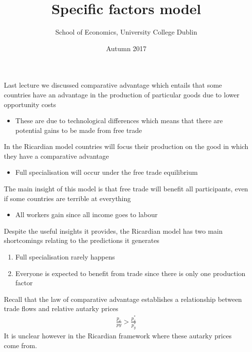 \documentclass{beamer}
\title{Specific factors model}
\author{School of Economics, University College Dublin}
\date{Autumn 2017}
\begin{document}
\begin{frame}
\titlepage  
\end{frame}

\begin{frame}
  Last lecture we discussed comparative advantage which entails that some countries have an advantage in the production of particular goods due to lower opportunity costs
  \begin{itemize}
    \item These are due to technological differences which means that there are potential gains to be made from free trade
  \end{itemize}
  \medskip
  In the Ricardian model countries will focus their production on the good in which they have a comparative advantage
  \begin{itemize}
    \item Full specialisation will occur under the free trade equilibrium
  \end{itemize}
  \medskip
  The main insight of this model is that free trade will benefit all participants, even if some countries are terrible at everything
  \begin{itemize}
    \item All workers gain since all income goes to labour
  \end{itemize}
\end{frame}

\begin{frame}
  Despite the useful insights it provides, the Ricardian model has two main shortcomings relating to the predictions it generates
  \medskip  
    \begin{enumerate}
      \item Full specialisation rarely happens
      \item Everyone is expected to benefit from trade since there is only one production factor      
    \end{enumerate}
\end{frame}


\begin{frame}
  Recall that the law of comparative advantage establishes a relationship between trade flows and relative autarky prices
  \begin{align*}
    \frac{p_x}{py} > \frac{p_x^*}{p_y^*}
  \end{align*}
  It is unclear however in the Ricardian framework where these autarky prices come from.
\end{frame}
\end{document}
